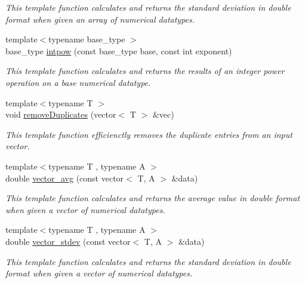 \begin{DoxyCompactItemize}
\begin{DoxyCompactList}\small\item\em This template function calculates and returns the standard deviation in double format when given an array of numerical datatypes. \end{DoxyCompactList}\item 
{\footnotesize template$<$typename base\+\_\+type $>$ }\\base\+\_\+type \hyperlink{namespace_utils_affd19edaa58a3f8425e1f7b4c9233f8a}{intpow} (const base\+\_\+type base, const int exponent)
\begin{DoxyCompactList}\small\item\em This template function calculates and returns the results of an integer power operation on a base numerical datatype. \end{DoxyCompactList}\item 
{\footnotesize template$<$typename T $>$ }\\void \hyperlink{namespace_utils_ae6b61a9030cf09d8cba2566a42c871df}{remove\+Duplicates} (vector$<$ T $>$ \&vec)
\begin{DoxyCompactList}\small\item\em This template function efficienctly removes the duplicate entries from an input vector. \end{DoxyCompactList}\item 
{\footnotesize template$<$typename T , typename A $>$ }\\double \hyperlink{namespace_utils_aadb08a5b50d04b076f4348a8f752932b}{vector\+\_\+avg} (const vector$<$ T, A $>$ \&data)
\begin{DoxyCompactList}\small\item\em This template function calculates and returns the average value in double format when given a vector of numerical datatypes. \end{DoxyCompactList}\item 
{\footnotesize template$<$typename T , typename A $>$ }\\double \hyperlink{namespace_utils_a04daea5e4b4bb28117b09e1abae4ec5c}{vector\+\_\+stdev} (const vector$<$ T, A $>$ \&data)
\begin{DoxyCompactList}\small\item\em This template function calculates and returns the standard deviation in double format when given a vector of numerical datatypes. \end{DoxyCompactList}\end{DoxyCompactItemize}


